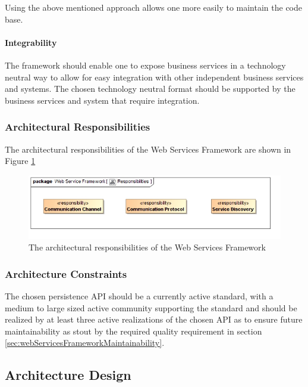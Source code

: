 Using the above mentioned approach allows one more easily to maintain the code
base.

\paragraph{Integrability}
The framework should enable one to expose business services in a technology
neutral way to allow for easy integration with other independent business
services and systems.  The chosen technology neutral format should be supported
by the business services and system that require integration.

\subsubsection{Architectural Responsibilities}
The architectural responsibilities of the Web Services Framework are shown in 
Figure \ref{fig:webServicesFrameworkResponsibilities}
\begin{figure}[H]
	\begin{center}
	\includegraphics[scale=0.5]{../Diagrams and Charts/Web Services Framework/Responsibilities.jpg}
	\caption{The architectural responsibilities of the Web Services Framework}
	\label{fig:webServicesFrameworkResponsibilities}
	\end{center}
\end{figure}

\subsubsection{Architecture Constraints}
The chosen persistence API should be a currently active standard, with a medium
to large sized active community supporting the standard and should be realized
by at least three active realizations of the chosen API as to ensure future 
maintainability as stout by the required quality requirement in 
section \ref{sec:webServicesFrameworkMaintainability}.

\subsection{Architecture Design}
